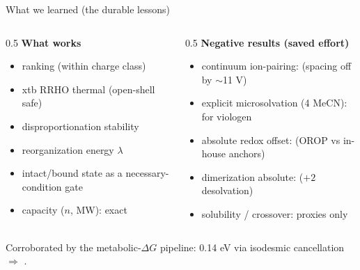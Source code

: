 \begin{frame}{What we learned (the durable lessons)}
  \begin{columns}[T]
    \begin{column}{0.5\textwidth}
      \textbf{\textcolor{good}{What works}}
      \begin{itemize}\footnotesize
        \item ranking (within charge class)
        \item xtb RRHO thermal (open-shell safe)
        \item disproportionation stability
        \item reorganization energy $\lambda$
        \item intact/bound state as a necessary-condition gate
        \item capacity ($n$, MW): exact
      \end{itemize}
    \end{column}
    \begin{column}{0.5\textwidth}
      \textbf{\textcolor{bad}{Negative results (saved effort)}}
      \begin{itemize}\footnotesize
        \item continuum ion-pairing:  (spacing off by $\sim$11 V)
        \item explicit microsolvation (4 MeCN):  for viologen
        \item absolute redox offset:  (OROP vs in-house anchors)
        \item dimerization absolute:  ($+2$ desolvation)
        \item solubility / crossover: proxies only
      \end{itemize}
    \end{column}
  \end{columns}
  \vspace{1ex}
  \begin{center}\small
  \textcolor{ink}{Corroborated by the metabolic-$\Delta G$ pipeline: 0.14 eV via isodesmic
  cancellation $\Rightarrow$ .}
  \end{center}
\end{frame}

